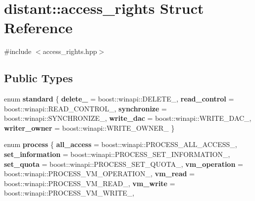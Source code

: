 \hypertarget{structdistant_1_1access__rights}{}\section{distant\+:\+:access\+\_\+rights Struct Reference}
\label{structdistant_1_1access__rights}


{\ttfamily \#include $<$access\+\_\+rights.\+hpp$>$}

\subsection*{Public Types}
\begin{DoxyCompactItemize}
\item 
\mbox{\label{structdistant_1_1access__rights_a1aa121d7e246b51f7386f992adce1664}} 
enum {\bfseries standard} \{ \newline
{\bfseries delete\+\_\+} = boost\+:\+:winapi\+:\+:D\+E\+L\+E\+T\+E\+\_\+, 
{\bfseries read\+\_\+control} = boost\+:\+:winapi\+:\+:R\+E\+A\+D\+\_\+\+C\+O\+N\+T\+R\+O\+L\+\_\+, 
{\bfseries synchronize} = boost\+:\+:winapi\+:\+:S\+Y\+N\+C\+H\+R\+O\+N\+I\+Z\+E\+\_\+, 
{\bfseries write\+\_\+dac} = boost\+:\+:winapi\+:\+:W\+R\+I\+T\+E\+\_\+\+D\+A\+C\+\_\+, 
\newline
{\bfseries writer\+\_\+owner} = boost\+:\+:winapi\+:\+:W\+R\+I\+T\+E\+\_\+\+O\+W\+N\+E\+R\+\_\+
 \}
\item 
\mbox{\label{structdistant_1_1access__rights_ae153052a690584111c46ec7a78d1ef81}} 
enum {\bfseries process} \{ \newline
{\bfseries all\+\_\+access} = boost\+:\+:winapi\+:\+:P\+R\+O\+C\+E\+S\+S\+\_\+\+A\+L\+L\+\_\+\+A\+C\+C\+E\+S\+S\+\_\+, 
{\bfseries set\+\_\+information} = boost\+:\+:winapi\+:\+:P\+R\+O\+C\+E\+S\+S\+\_\+\+S\+E\+T\+\_\+\+I\+N\+F\+O\+R\+M\+A\+T\+I\+O\+N\+\_\+, 
{\bfseries set\+\_\+quota} = boost\+:\+:winapi\+:\+:P\+R\+O\+C\+E\+S\+S\+\_\+\+S\+E\+T\+\_\+\+Q\+U\+O\+T\+A\+\_\+, 
{\bfseries vm\+\_\+operation} = boost\+:\+:winapi\+:\+:P\+R\+O\+C\+E\+S\+S\+\_\+\+V\+M\+\_\+\+O\+P\+E\+R\+A\+T\+I\+O\+N\+\_\+, 
\newline
{\bfseries vm\+\_\+read} = boost\+:\+:winapi\+:\+:P\+R\+O\+C\+E\+S\+S\+\_\+\+V\+M\+\_\+\+R\+E\+A\+D\+\_\+, 
{\bfseries vm\+\_\+write} = boost\+:\+:winapi\+:\+:P\+R\+O\+C\+E\+S\+S\+\_\+\+V\+M\+\_\+\+W\+R\+I\+T\+E\+\_\+, 

\end{DoxyCompactItemize}
